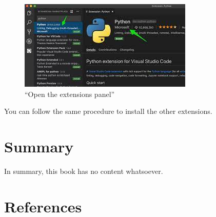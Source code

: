 \documentclass[
  letterpaper,
  DIV=11,
  numbers=noendperiod]{scrreprt}
\newlength{\cslhangindent}
\newlength{\cslentryspacingunit} %
\newenvironment{CSLReferences}[2] %
 {%
  \setlength{\parindent}{0pt}
  \ifodd #1
  \let\oldpar\par
  \def\par{\hangindent=\cslhangindent\oldpar}
  \fi
  \setlength{\parskip}{#2\cslentryspacingunit}
 }%
 {}
\begin{document}
\begin{figure}

{\centering \includegraphics{"images/vs_ext_install.jpeg"}

}

\caption{``Open the extensions panel''}

\end{figure}

You can follow the same procedure to install the other extensions.


\hypertarget{summary}{%
\chapter{Summary}\label{summary}}

In summary, this book has no content whatsoever.


\hypertarget{references}{%
\chapter*{References}\label{references}}


\hypertarget{refs}{}
\begin{CSLReferences}{0}{0}
\end{CSLReferences}
\end{document}
